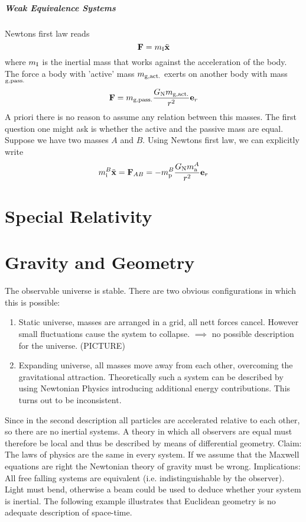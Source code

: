 \documentclass[
    a4paper,                                               %
    oneside,                                               %
    12pt,                                                  %
    headsepline,                                           %
    xcolor=dvipsnames
    ]{scrreprt}
\theoremstyle{definition}
\theoremstyle{remark}
\renewcommand{\vec}{\mathbf}
\begin{document}
		\paragraph{Weak Equivalence Systems}
		Newtons first law reads 
		\begin{equation}
			\vec{F}=m\textsubscript{I}\ddot{\vec{x}}
		\end{equation}
		where $m\textsubscript{I}$ is the inertial mass that works against the acceleration of the body.
		The force a body with 'active' mass $m\textsubscript{g,act.}$ exerts on another body with mass $\textsubscript{g,pass.}$
		\begin{equation}
		\vec{F}=m\textsubscript{g,pass.}\frac{G\textsubscript{N}m\textsubscript{g,act.}}{r^2}\vec{e}_r
		\end{equation}
		A priori there is no reason to assume any relation between this masses. The first question one might ask is whether the active and the passive mass are equal. Suppose we have two masses $A$ and $B$. Using Newtons first law, we can explicitly write 
		\begin{equation}
			m^{B}_{\text{i}}\ddot{\vec{x}}=\vec{F}_{AB}=-	m^{B}_{\text{p}}\frac{G\textsubscript{N}m^{A}_{\text{a}}}{r^2}\vec{e}_r
		\end{equation}
    	\chapter{Special Relativity}
    	\chapter{Gravity and Geometry}
    	The observable universe is stable. There are two obvious configurations in which this is possible:
    	\begin{enumerate}
    		\item Static universe, masses are arranged in a grid, all nett forces cancel. However small fluctuations cause the system to collapse. 
    		$\implies$ no possible description for the universe. (PICTURE)
    		\item Expanding universe, all masses move away from each other, overcoming the gravitational attraction. Theoretically such a system can be described by using Newtonian Physics introducing additional energy contributions. This turns out to be inconsistent.
    	\end{enumerate}
    	Since in the second description all particles are accelerated relative to each other, so there are no inertial systems. A theory in which all observers are equal must therefore be local and thus be described by means of differential geometry.
    	Claim: The laws of physics are the same in every system. 
    	If we assume that the Maxwell equations are right the Newtonian theory of gravity must be wrong.
    	Implications:
    	All free falling systems are equivalent (i.e. indistinguishable by the observer). Light must bend, otherwise a beam could be used to deduce whether your system is inertial.
    	The following example illustrates that Euclidean geometry is no adequate description of space-time. 
\end{document}
